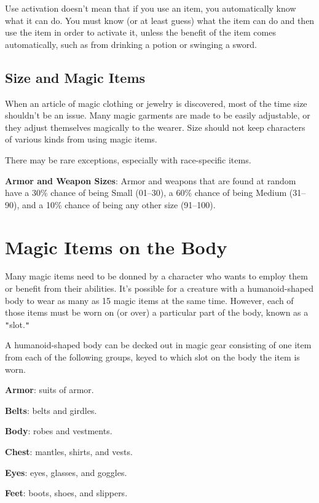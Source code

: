 Use activation doesn't mean that if you use an item, you automatically know what it can do. You must know (or at least guess) what the item can do and then use the item in order to activate it, unless the benefit of the item comes automatically, such as from drinking a potion or swinging a sword.
				
\subsection{Size and Magic Items}

				
When an article of magic clothing or jewelry is discovered, most of the time size shouldn't be an issue. Many magic garments are made to be easily adjustable, or they adjust themselves magically to the wearer. Size should not keep characters of various kinds from using magic items.
				
There may be rare exceptions, especially with race-specific items. 
				
\textbf{Armor and Weapon Sizes}: Armor and weapons that are found at random have a 30\% chance of being Small (01--30), a 60\% chance of being Medium (31--90), and a 10\% chance of being any other size (91--100).
				
\section{Magic Items on the Body}

				
Many magic items need to be donned by a character who wants to employ them or benefit from their abilities. It's possible for a creature with a humanoid-shaped body to wear as many as 15 magic items at the same time. However, each of those items must be worn on (or over) a particular part of the body, known as a \texttt{{}"{}}slot.\texttt{{}"{}}
				
A humanoid-shaped body can be decked out in magic gear consisting of one item from each of the following groups, keyed to which slot on the body the item is worn.
				
\textbf{Armor}: suits of armor.
				
\textbf{Belts}: belts and girdles.
				
\textbf{Body}: robes and vestments.
				
\textbf{Chest}: mantles, shirts, and vests.
				
\textbf{Eyes}: eyes, glasses, and goggles.
				
\textbf{Feet}: boots, shoes, and slippers.
				
